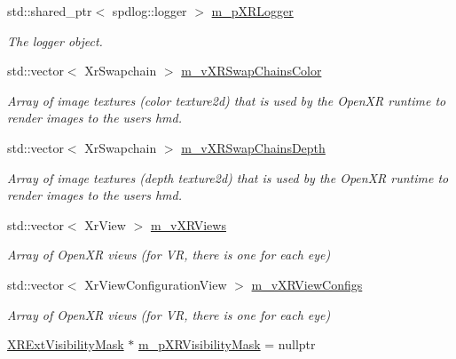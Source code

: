 \begin{DoxyCompactItemize}
std\+::shared\+\_\+ptr$<$ spdlog\+::logger $>$ \mbox{\hyperlink{class_open_x_r_provider_1_1_x_r_render_manager_a44e874b027aa24d211fcdf6cde2d1b28}{m\+\_\+p\+X\+R\+Logger}}
\begin{DoxyCompactList}\small\item\em The logger object. \end{DoxyCompactList}\item 
std\+::vector$<$ Xr\+Swapchain $>$ \mbox{\hyperlink{class_open_x_r_provider_1_1_x_r_render_manager_a6cbe21e466e02dcf45fefe062aed4c9f}{m\+\_\+v\+X\+R\+Swap\+Chains\+Color}}
\begin{DoxyCompactList}\small\item\em Array of image textures (color texture2d) that is used by the Open\+XR runtime to render images to the user\textquotesingle{}s hmd. \end{DoxyCompactList}\item 
std\+::vector$<$ Xr\+Swapchain $>$ \mbox{\hyperlink{class_open_x_r_provider_1_1_x_r_render_manager_a438d088335da03c2c642a98af34b9f1f}{m\+\_\+v\+X\+R\+Swap\+Chains\+Depth}}
\begin{DoxyCompactList}\small\item\em Array of image textures (depth texture2d) that is used by the Open\+XR runtime to render images to the user\textquotesingle{}s hmd. \end{DoxyCompactList}\item 
std\+::vector$<$ Xr\+View $>$ \mbox{\hyperlink{class_open_x_r_provider_1_1_x_r_render_manager_a25d5a9b0e65ff354082281d11cfe6bf3}{m\+\_\+v\+X\+R\+Views}}
\begin{DoxyCompactList}\small\item\em Array of Open\+XR views (for VR, there is one for each eye) \end{DoxyCompactList}\item 
std\+::vector$<$ Xr\+View\+Configuration\+View $>$ \mbox{\hyperlink{class_open_x_r_provider_1_1_x_r_render_manager_a87a36cbfba8e5d2d733b47b1e0bb6558}{m\+\_\+v\+X\+R\+View\+Configs}}
\begin{DoxyCompactList}\small\item\em Array of Open\+XR views (for VR, there is one for each eye) \end{DoxyCompactList}\item 
\mbox{\hyperlink{class_open_x_r_provider_1_1_x_r_ext_visibility_mask}{X\+R\+Ext\+Visibility\+Mask}} $\ast$ \mbox{\hyperlink{class_open_x_r_provider_1_1_x_r_render_manager_af5bf048e754360884f06006598d5682d}{m\+\_\+p\+X\+R\+Visibility\+Mask}} = nullptr

\end{DoxyCompactItemize}
